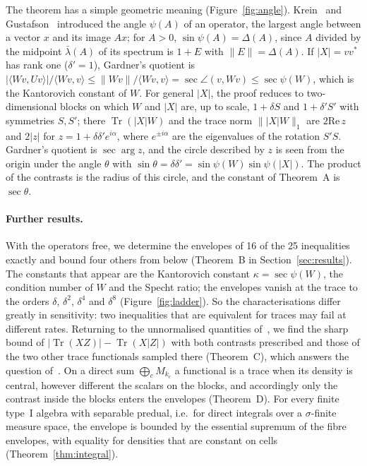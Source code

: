 \documentclass[11pt]{article}
\DeclareMathOperator{\Tr}{Tr}
\renewcommand{\Re}{\mathrm{Re}\,}
\theoremstyle{plain}
\theoremstyle{definition}
\theoremstyle{remark}
\begin{document}
The theorem has a simple geometric meaning (Figure~\ref{fig:angle}). Krein~\cite{krein1969} and
Gustafson~\cite{gustafson1968} introduced the angle $\psi(A)$ of an operator, the largest angle between a vector $x$ and
its image $Ax$; for $A>0$, $\sin\psi(A)=\Delta(A)$, since $A$ divided by the midpoint $\bar\lambda(A)$ of its spectrum is
$1+E$ with $\|E\|=\Delta(A)$. If $|X|=vv^*$ has rank one ($\delta'=1$), Gardner's quotient is
$|\langle Wv,Uv\rangle|/\langle Wv,v\rangle\le\|Wv\|/\langle Wv,v\rangle=\sec\angle(v,Wv)\le\sec\psi(W)$, which is the
Kantorovich constant of $W$. For general $|X|$, the proof reduces to two-dimensional blocks on which $W$ and $|X|$ are,
up to scale, $1+\delta S$ and $1+\delta'S'$ with symmetries $S,S'$; there $\Tr(|X|W)$ and the trace norm
$\||X|W\|_1$ are $2\Re z$ and $2|z|$ for $z=1+\delta\delta'e^{i\alpha}$, where $e^{\pm i\alpha}$ are the eigenvalues of the
rotation $S'S$. Gardner's quotient is $\sec\arg z$, and the circle described by $z$ is seen from the origin under the
angle $\theta$ with $\sin\theta=\delta\delta'=\sin\psi(W)\sin\psi(|X|)$. The product of the contrasts is the radius of this
circle, and the constant of Theorem~A is $\sec\theta$.

\paragraph{Further results.} With the operators free, we determine the envelopes of 16 of the 25 inequalities exactly
and bound four others from below (Theorem~B in Section~\ref{sec:results}). The constants that appear are the
Kantorovich constant $\kappa=\sec\psi(W)$, the condition number of $W$ and the Specht ratio; the envelopes vanish at the
trace to the orders $\delta$, $\delta^2$, $\delta^4$ and $\delta^8$ (Figure~\ref{fig:ladder}). So the characterisations
differ greatly in sensitivity: two inequalities that are equivalent for traces may fail at different rates. Returning
to the unnormalised quantities of~\cite{abed2024}, we find the sharp bound of $|\Tr(XZ)|-\Tr(X|Z|)$ with both contrasts
prescribed and those of the two other trace functionals sampled there (Theorem~C), which answers the question
of~\cite{abed2024}. On a direct sum $\bigoplus_cM_{k_c}$ a functional is a trace when its density is central, however
different the scalars on the blocks, and accordingly only the contrast inside the blocks enters the envelopes
(Theorem~D). For every finite type~I algebra with separable predual, i.e.\ for direct integrals over a $\sigma$-finite
measure space, the envelope is bounded by the essential supremum of the fibre envelopes, with equality for densities that
are constant on cells (Theorem~\ref{thm:integral}).
\end{document}
